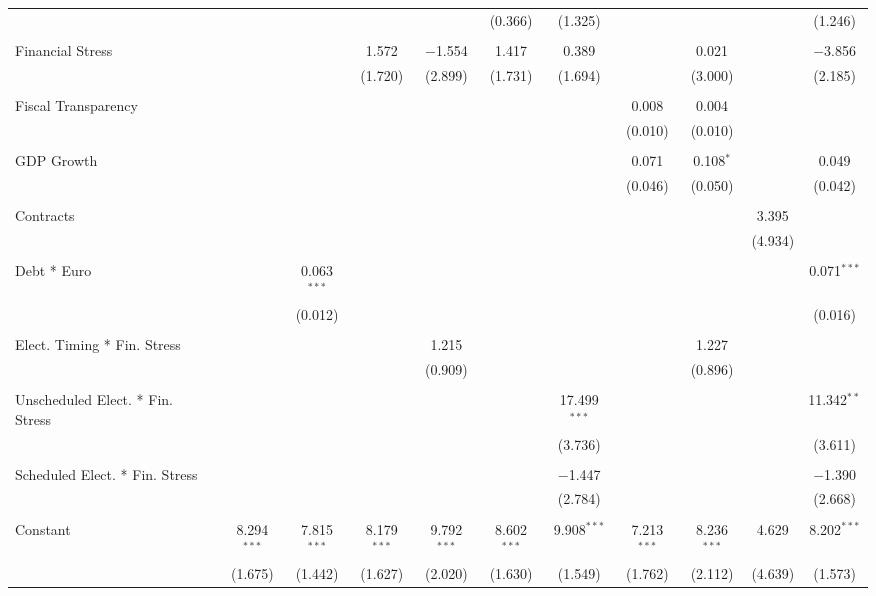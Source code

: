 \begin{table}[!htbp]
\begin{tabular}{@{\extracolsep{5pt}}lcccccccccc}
  &  &  &  &  & (0.366) & (1.325) &  &  &  & (1.246) \\ 
  & & & & & & & & & & \\ 
 Financial Stress &  &  & 1.572 & $-$1.554 & 1.417 & 0.389 &  & 0.021 &  & $-$3.856 \\ 
  &  &  & (1.720) & (2.899) & (1.731) & (1.694) &  & (3.000) &  & (2.185) \\ 
  & & & & & & & & & & \\ 
 Fiscal Transparency &  &  &  &  &  &  & 0.008 & 0.004 &  &  \\ 
  &  &  &  &  &  &  & (0.010) & (0.010) &  &  \\ 
  & & & & & & & & & & \\ 
 GDP Growth &  &  &  &  &  &  & 0.071 & 0.108$^{*}$ &  & 0.049 \\ 
  &  &  &  &  &  &  & (0.046) & (0.050) &  & (0.042) \\ 
  & & & & & & & & & & \\ 
 Contracts &  &  &  &  &  &  &  &  & 3.395 &  \\ 
  &  &  &  &  &  &  &  &  & (4.934) &  \\ 
  & & & & & & & & & & \\ 
 Debt * Euro &  & 0.063$^{***}$ &  &  &  &  &  &  &  & 0.071$^{***}$ \\ 
  &  & (0.012) &  &  &  &  &  &  &  & (0.016) \\ 
  & & & & & & & & & & \\ 
 Elect. Timing * Fin. Stress &  &  &  & 1.215 &  &  &  & 1.227 &  &  \\ 
  &  &  &  & (0.909) &  &  &  & (0.896) &  &  \\ 
  & & & & & & & & & & \\ 
 Unscheduled Elect. * Fin. Stress &  &  &  &  &  & 17.499$^{***}$ &  &  &  & 11.342$^{**}$ \\ 
  &  &  &  &  &  & (3.736) &  &  &  & (3.611) \\ 
  & & & & & & & & & & \\ 
 Scheduled Elect. * Fin. Stress &  &  &  &  &  & $-$1.447 &  &  &  & $-$1.390 \\ 
  &  &  &  &  &  & (2.784) &  &  &  & (2.668) \\ 
  & & & & & & & & & & \\ 
 Constant & 8.294$^{***}$ & 7.815$^{***}$ & 8.179$^{***}$ & 9.792$^{***}$ & 8.602$^{***}$ & 9.908$^{***}$ & 7.213$^{***}$ & 8.236$^{***}$ & 4.629 & 8.202$^{***}$ \\ 
  & (1.675) & (1.442) & (1.627) & (2.020) & (1.630) & (1.549) & (1.762) & (2.112) & (4.639) & (1.573) \\ 

\end{tabular}
\end{table}
